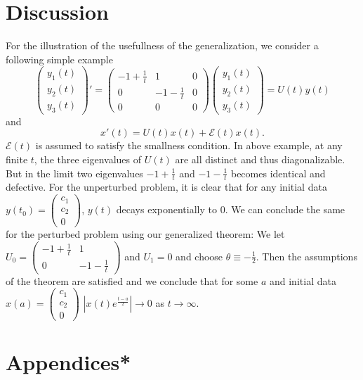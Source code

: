 \documentclass[a4paper,11pt]{article}
\newcommand{\E}{\mathcal{E}}
\theoremstyle{remark}
\begin{document}
\section{Discussion}
For the illustration of the usefullness of the generalization, we consider a following simple example
$$ \begin{pmatrix} y_1(t) \\ y_2(t) \\ y_3(t) \end{pmatrix}' = \begin{pmatrix} -1 + \frac{1}{t} & 1 & 0 \\0 & -1- \frac{1}{t} & 0 \\ 0 & 0 & 0\end{pmatrix} \begin{pmatrix} y_1(t) \\ y_2(t) \\ y_3(t) \end{pmatrix} = U(t)y(t)$$
and 
$$x'(t) = U(t)x(t)+ \E(t)x(t).$$
$\E(t)$ is assumed to satisfy the smallness condition.
In above example, at any finite $t$, the three eigenvalues of $U(t)$ are all distinct and thus diagonalizable. But in the limit two eigenvalues $-1 + \frac{1}{t}$ and $-1-\frac{1}{t}$ becomes identical and defective. For the unperturbed problem, it is clear that for any initial data $y(t_0) = \begin{pmatrix} c_1 \\ c_2 \\ 0 \end{pmatrix}$, $y(t)$ decays exponentially to $0$. We can conclude the same for the perturbed problem using our generalized theorem: We let $U_0 = \begin{pmatrix} -1 + \frac{1}{t} & 1 \\0 & -1- \frac{1}{t} \end{pmatrix}$ and $U_1 = 0$ and choose $\theta\equiv -\frac{1}{2}$. Then the assumptions of the theorem are satisfied and we conclude that for some $a$ and initial data $x(a) = \begin{pmatrix} c_1 \\ c_2 \\ 0 \end{pmatrix}$ $|x(t)e^{\frac{t-a}{2}}| \rightarrow 0$ as $t \rightarrow \infty$.
\section{Appendices*}
\end{document}
